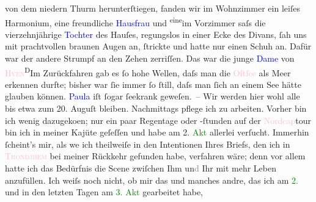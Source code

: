                     von dem niedern Thurm herunterſtiegen, fanden wir im Wohnzimmer ein leiſes
                    Harmonium, eine freundliche \textcolor{blue}{Hausfrau}{} und \substVorne{}\textsuperscript{eine}\substDazwischen{}im\substHinten{} Vorzimmer saſs die vierzehnjährige \textcolor{blue}{Tochter}{} des Hauſes, regungslos in einer Ecke des
                    Divans, ſah uns mit prachtvollen braunen Augen an, {\pb}ſtrickte und hatte nur einen Schuh an. Dafür war der andere Strumpf an den
                    Zehen zerriſſen. Das war die junge \textcolor{blue}{Dame}{} von \textcolor{pink}{\textsc{Hven}}{}\ledrightnote{\textcolor{pink}{Ven}}{\dotstwo}{ }\substVorne{}\textsuperscript{D}\substDazwischen{}I\substHinten{}m Zurückfahren gab es ſo hohe Wellen, daſs man die \textcolor{pink}{Oſtſee}{}\ledrightnote{\textcolor{pink}{Ostsee}} als Meer erkennen durfte; bisher war ſie immer ſo
                    ſtill, daſs man ſich an einem See hätte glauben können. \textcolor{blue}{Paula}{}\ledrightnote{\textcolor{blue}{Paula Beer-Hofmann}} iſt ſogar ſeekrank geweſen. – Wir werden hier wohl
                    alle bis etwa zum 20. Auguſt bleiben. Nachmittags
                    pflege ich zu arbeiten. Vorher bin ich {\pb}wenig
                        dazugeko{\geminationm}en; nur ein paar Regentage oder
                    -ſtunden auf der \textcolor{pink}{Nordcap}{}\ledrightnote{\textcolor{pink}{Nordkap}}tour bin ich in
                    meiner Kajüte geſeſſen und habe am 2. \textcolor{green}{Akt}{} allerlei verſucht. Immerhin ſcheint’s mir, als
                        we{\geminationn} ich theilweiſe in den Intentionen Ihres
                    Briefs, den ich in \textcolor{pink}{\textsc{Trondjhem}}{}\ledrightnote{\textcolor{pink}{Trondheim}} bei meiner Rückkehr gefunden habe, verfahren wäre;
                    denn vor allem hatte ich das Bedürfnis die Scene zwiſchen Ihm
                        un\textcolor{gray}{d} Ihr mit mehr Leben anzufüllen. Ich weiſs noch nicht,
                    ob mir das {\pb}und manches andre, das ich am \textcolor{green}{2.}{} und in den letzten Tagen
                    am \textcolor{green}{3. Akt}{} gearbeitet habe,
